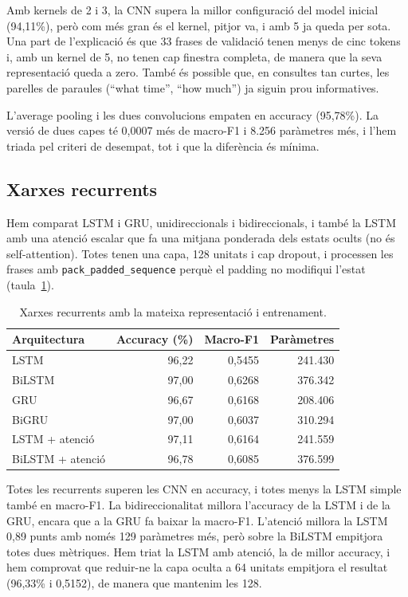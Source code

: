 \documentclass[11pt,a4paper]{article}
\begin{document}
Amb kernels de 2 i 3, la CNN supera la millor configuració del model inicial (94,11\%), però com més gran és el
kernel, pitjor va, i amb 5 ja queda per sota. Una part de l'explicació és que 33 frases de validació tenen menys
de cinc tokens i, amb un kernel de 5, no tenen cap finestra completa, de manera que la seva representació queda a
zero. També és possible que, en consultes tan curtes, les parelles de paraules (``what time'', ``how much'') ja
siguin prou informatives.

L'average pooling i les dues convolucions empaten en accuracy (95,78\%). La versió de dues capes té 0,0007 més de
macro-F1 i 8.256 paràmetres més, i l'hem triada pel criteri de desempat, tot i que la diferència és mínima.

\subsection{Xarxes recurrents}
\label{sec:rnn}

Hem comparat LSTM i GRU, unidireccionals i bidireccionals, i també la LSTM amb una atenció escalar que fa una
mitjana ponderada dels estats ocults (no és self-attention). Totes tenen una capa, 128 unitats i cap dropout, i
processen les frases amb \texttt{pack\_padded\_sequence} perquè el padding no modifiqui l'estat
(taula~\ref{tab:rnn}).

\begin{table}[ht]
\centering\small
\caption{Xarxes recurrents amb la mateixa representació i entrenament.}
\label{tab:rnn}
\begin{tabular}{lrrr}
\toprule
Arquitectura & Accuracy (\%) & Macro-F1 & Paràmetres\\
\midrule
LSTM & 96,22 & 0,5455 & 241.430 \\
BiLSTM & 97,00 & 0,6268 & 376.342 \\
GRU & 96,67 & 0,6168 & 208.406 \\
BiGRU & 97,00 & 0,6037 & 310.294 \\
LSTM + atenció & 97,11 & 0,6164 & 241.559 \\
BiLSTM + atenció & 96,78 & 0,6085 & 376.599 \\
\bottomrule
\end{tabular}
\end{table}

Totes les recurrents superen les CNN en accuracy, i totes menys la LSTM simple també en macro-F1. La
bidireccionalitat millora l'accuracy de la LSTM i de la GRU, encara que a la GRU fa baixar la macro-F1. L'atenció
millora la LSTM 0,89 punts amb només 129 paràmetres més, però sobre la BiLSTM empitjora totes dues mètriques. Hem
triat la LSTM amb atenció, la de millor accuracy, i hem comprovat que reduir-ne la capa oculta a 64 unitats
empitjora el resultat (96,33\% i 0,5152), de manera que mantenim les 128.
\end{document}

